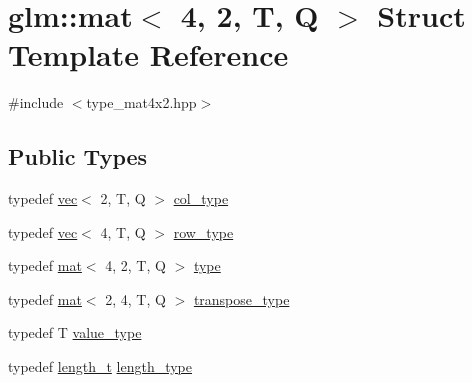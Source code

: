 \hypertarget{structglm_1_1mat_3_014_00_012_00_01_t_00_01_q_01_4}{}\section{glm\+:\+:mat$<$ 4, 2, T, Q $>$ Struct Template Reference}
\label{structglm_1_1mat_3_014_00_012_00_01_t_00_01_q_01_4}


{\ttfamily \#include $<$type\+\_\+mat4x2.\+hpp$>$}

\subsection*{Public Types}
\begin{DoxyCompactItemize}
\item 
typedef \mbox{\hyperlink{structglm_1_1vec}{vec}}$<$ 2, T, Q $>$ \mbox{\hyperlink{structglm_1_1mat_3_014_00_012_00_01_t_00_01_q_01_4_a60138ab077eb3bef96e654e672af5059}{col\+\_\+type}}
\item 
typedef \mbox{\hyperlink{structglm_1_1vec}{vec}}$<$ 4, T, Q $>$ \mbox{\hyperlink{structglm_1_1mat_3_014_00_012_00_01_t_00_01_q_01_4_a33d6c2074d5507b728a6e2e91a84f6a8}{row\+\_\+type}}
\item 
typedef \mbox{\hyperlink{structglm_1_1mat}{mat}}$<$ 4, 2, T, Q $>$ \mbox{\hyperlink{structglm_1_1mat_3_014_00_012_00_01_t_00_01_q_01_4_aecca78e9fbf467c7558b6018401c3f29}{type}}
\item 
typedef \mbox{\hyperlink{structglm_1_1mat}{mat}}$<$ 2, 4, T, Q $>$ \mbox{\hyperlink{structglm_1_1mat_3_014_00_012_00_01_t_00_01_q_01_4_ab74329af13d01d0d1bdac3ea3619fc68}{transpose\+\_\+type}}
\item 
typedef T \mbox{\hyperlink{structglm_1_1mat_3_014_00_012_00_01_t_00_01_q_01_4_aad6b55a7bcab7ce036cd5d5f5b963c6e}{value\+\_\+type}}
\item 
typedef \mbox{\hyperlink{namespaceglm_a090a0de2260835bee80e71a702492ed9}{length\+\_\+t}} \mbox{\hyperlink{structglm_1_1mat_3_014_00_012_00_01_t_00_01_q_01_4_a4b192a2630331f70ca61657d9783026e}{length\+\_\+type}}
\end{DoxyCompactItemize}
